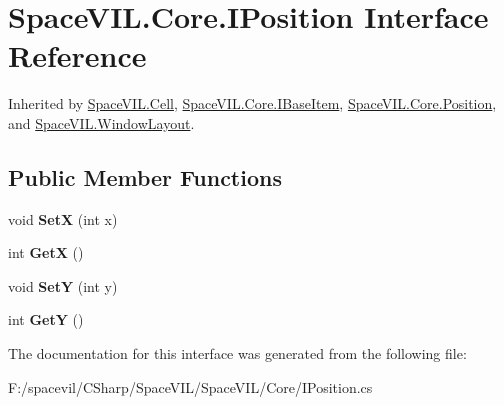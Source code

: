 \hypertarget{interface_space_v_i_l_1_1_core_1_1_i_position}{}\section{Space\+V\+I\+L.\+Core.\+I\+Position Interface Reference}
\label{interface_space_v_i_l_1_1_core_1_1_i_position}


Inherited by \mbox{\hyperlink{class_space_v_i_l_1_1_cell}{Space\+V\+I\+L.\+Cell}}, \mbox{\hyperlink{interface_space_v_i_l_1_1_core_1_1_i_base_item}{Space\+V\+I\+L.\+Core.\+I\+Base\+Item}}, \mbox{\hyperlink{class_space_v_i_l_1_1_core_1_1_position}{Space\+V\+I\+L.\+Core.\+Position}}, and \mbox{\hyperlink{class_space_v_i_l_1_1_window_layout}{Space\+V\+I\+L.\+Window\+Layout}}.

\subsection*{Public Member Functions}
\begin{DoxyCompactItemize}
\item 
\mbox{\label{interface_space_v_i_l_1_1_core_1_1_i_position_a9a98baa12afe5da8cdc553d0ce25369f}} 
void {\bfseries SetX} (int x)
\item 
\mbox{\label{interface_space_v_i_l_1_1_core_1_1_i_position_a67fb53a55aadf1038903346778b41318}} 
int {\bfseries GetX} ()
\item 
\mbox{\label{interface_space_v_i_l_1_1_core_1_1_i_position_afdecfb9237eb56c074b391fc2ad8fe5b}} 
void {\bfseries SetY} (int y)
\item 
\mbox{\label{interface_space_v_i_l_1_1_core_1_1_i_position_a2d11f35d825eba597abb021e7f146f06}} 
int {\bfseries GetY} ()
\end{DoxyCompactItemize}


The documentation for this interface was generated from the following file\+:\begin{DoxyCompactItemize}
\item 
F\+:/spacevil/\+C\+Sharp/\+Space\+V\+I\+L/\+Space\+V\+I\+L/\+Core/I\+Position.\+cs\end{DoxyCompactItemize}
